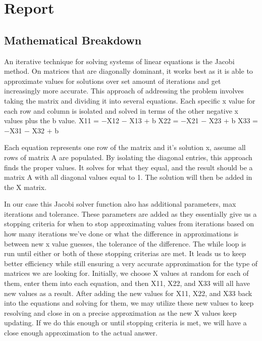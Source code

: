 \documentclass[12pt]{article}
\begin{document}
	
\section{Report }


\subsection{Mathematical Breakdown}

An iterative technique for solving systems of linear equations is the Jacobi method. On matrices that are diagonally dominant, it works best as it is able to approximate values for solutions over set amount of iterations and get increasingly more accurate.
This approach of addressing the problem involves taking the matrix and dividing it into several equations. Each specific x value for each row and column is isolated and solved in terms of the other negative x values plus the b value. \newline
X11 = −X12 − X13 + b \newline
X22 = −X21 − X23 + b \newline
X33 = −X31 − X32 + b \newline

Each equation represents one row of  the matrix and it's solution x, assume all rows of matrix A are populated. By isolating the diagonal entries, this approach finds the proper values. It solves for what they equal, and the result should be a matrix A with all diagonal values equal to 1. The solution will then be added in the X matrix.  \newline

In our case this Jacobi solver function also has additional parameters, max iterations and tolerance. These parameters are added as they essentially give us a stopping criteria for when to stop approximating values from iterations based on how many iterations we've done or what the difference in approximations is between new x value guesses, the tolerance of the difference. The while loop is run until either or both of these stopping criterias are met. It leads us to keep better efficiency while still ensuring a very accurate approximation for the type of matrices we are looking for. 
Initially, we choose X values at random for each of them, enter them into each equation, and then X11, X22, and X33 will all have new values as a result. After adding the new values for X11, X22, and X33 back into the equations and solving for them, we may utilize these new values to keep resolving and close in on a precise approximation as the new X values keep updating. If we do this enough or until stopping criteria is met, we will have a close enough approximation to the actual answer.
\end{document}
